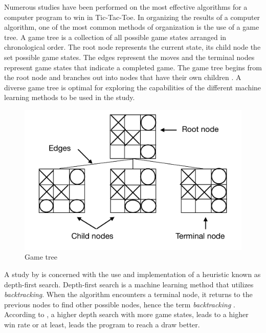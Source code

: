 \documentclass{strrespaper-trad}
\newcommand{\ttt}{Tic-Tac-Toe}
\begin{document}
			Numerous studies have been performed on the most effective algorithms for a computer program to win in \ttt.
			In organizing the results of a computer algorithm, one of the most common methods of organization is the use of a game tree.
			A game tree is a collection of all possible game states arranged in chronological order.
			The root node represents the current state, its child node the set possible game states.
			The edges represent the moves and the terminal nodes represent game states that indicate a completed game.
			The game tree begins from the root node and branches out into nodes that have their own children \autocite{adamchikGameTrees2009}.
			A diverse game tree is optimal for exploring the capabilities of the different machine learning methods to be used in the study.

			\begin{figure}
				\centering
				\includegraphics[width=0.7\linewidth]{gametree}
				\caption{Game tree}
				\label{fig:gametree}
			\end{figure}

			A study by \textcite{cranenburghTicTacToe2007} is concerned with the use and implementation of a heuristic known as depth-first search. Depth-first search is a machine learning method that utilizes \textit{backtracking}.
			When the algorithm encounters a terminal node, it returns to the previous nodes to find other possible nodes, hence the term \textit{backtracking} \autocite{hackerearthDepthFirstSearch2019}.
			According to \textcite{cranenburghTicTacToe2007}, a higher depth search with more game states, leads to a higher win rate or at least, leads the program to reach a draw better.
\end{document}
